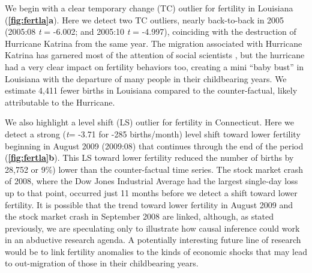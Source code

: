 \documentclass[12pt]{article}
\begin{document}
We begin with a clear temporary change (TC) outlier for fertility in
Louisiana (\textbf{\autoref{fig:fertla}a}). Here we detect two TC
outliers, nearly back-to-back in 2005 (2005:08 \emph{t} = -6.002; and
2005:10 \emph{t} = -4.997), coinciding with the destruction of Hurricane
Katrina from the same year. The migration associated with Hurricane
Katrina has garnered most of the attention of social scientists
\citep{fussellRecoveryMigrationCity2014, horiDisplacementDynamicsSouthern2009},
but the hurricane had a very clear impact on fertility behaviors too,
creating a mini ``baby bust'' in Louisiana with the departure of many
people in their childbearing years. We estimate 4,411 fewer births in
Louisiana compared to the counter-factual, likely attributable to the
Hurricane.

We also highlight a level shift (LS) outlier for fertility in
Connecticut. Here we detect a strong (\emph{t}= -3.71 for -285
births/month) level shift toward lower fertility beginning in August
2009 (2009:08) that continues through the end of the period
(\textbf{\autoref{fig:fertla}b}). This LS toward lower fertility reduced
the number of births by 28,752 or 9\%) lower than the counter-factual
time series. The stock market crash of 2008, where the Dow Jones
Industrial Average had the largest single-day loss up to that point,
occurred just 11 months before we detect a shift toward lower fertility.
It is possible that the trend toward lower fertility in August 2009 and
the stock market crash in September 2008 are linked, although, as stated
previously, we are speculating only to illustrate how causal inference
could work in an abductive research agenda. A potentially interesting
future line of research would be to link fertility anomalies to the
kinds of economic shocks that may lead to out-migration of those in
their childbearing years.
\end{document}

